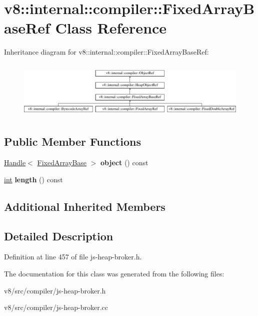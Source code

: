 \hypertarget{classv8_1_1internal_1_1compiler_1_1FixedArrayBaseRef}{}\section{v8\+:\+:internal\+:\+:compiler\+:\+:Fixed\+Array\+Base\+Ref Class Reference}
\label{classv8_1_1internal_1_1compiler_1_1FixedArrayBaseRef}
Inheritance diagram for v8\+:\+:internal\+:\+:compiler\+:\+:Fixed\+Array\+Base\+Ref\+:\begin{figure}[H]
\begin{center}
\leavevmode
\includegraphics[height=2.817610cm]{classv8_1_1internal_1_1compiler_1_1FixedArrayBaseRef}
\end{center}
\end{figure}
\subsection*{Public Member Functions}
\begin{DoxyCompactItemize}
\item 
\mbox{\label{classv8_1_1internal_1_1compiler_1_1FixedArrayBaseRef_a1c2bffa8f629fde4f96e93810359321a}} 
\mbox{\hyperlink{classv8_1_1internal_1_1Handle}{Handle}}$<$ \mbox{\hyperlink{classv8_1_1internal_1_1FixedArrayBase}{Fixed\+Array\+Base}} $>$ {\bfseries object} () const
\item 
\mbox{\label{classv8_1_1internal_1_1compiler_1_1FixedArrayBaseRef_a01c4f0d155526b85814a2f2490914584}} 
\mbox{\hyperlink{classint}{int}} {\bfseries length} () const
\end{DoxyCompactItemize}
\subsection*{Additional Inherited Members}


\subsection{Detailed Description}


Definition at line 457 of file js-\/heap-\/broker.\+h.



The documentation for this class was generated from the following files\+:\begin{DoxyCompactItemize}
\item 
v8/src/compiler/js-\/heap-\/broker.\+h\item 
v8/src/compiler/js-\/heap-\/broker.\+cc\end{DoxyCompactItemize}
